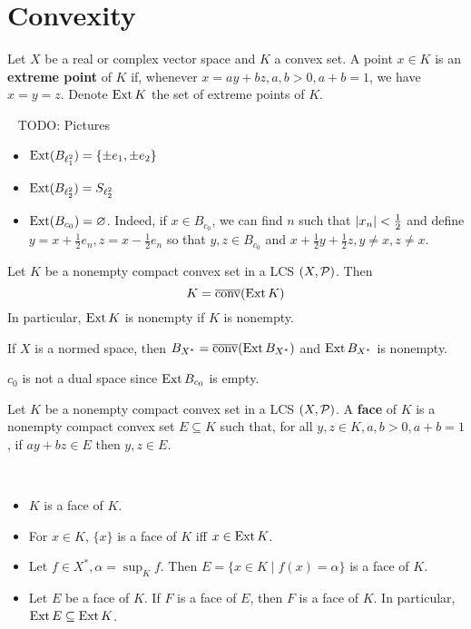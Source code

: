 \documentclass{article}
\begin{document}
\clearpage

\section{Convexity}

Let $X$ be a real or complex vector space and $K$ a convex set. A point $x \in K$ is an {\bf extreme point} of $K$ if, whenever $x = ay + bz, a, b > 0, a + b = 1$, we have $x = y = z$. Denote $\operatorname{Ext} K$ the set of extreme points of $K$.

\begin{egs}~
  TODO: Pictures
  \begin{itemize}
    \item $\operatorname{Ext}(B_{\ell_1^2}) = \{\pm e_1, \pm e_2\}$
    \item $\operatorname{Ext}(B_{\ell_2^2}) = S_{\ell_2^2}$
    \item $\operatorname{Ext}(B_{c_0}) = \varnothing$. Indeed, if $x \in B_{c_0}$, we can find $n$ such that $\left\lvert x_n\right\rvert < \frac 12$ and define $y = x + \frac 12 e_n, z = x - \frac 12 e_n$ so that $y, z \in B_{c_0}$ and $x + \frac 12 y + \frac 12 z, y \ne x, z \ne x$.
  \end{itemize}
\end{egs}

\begin{nthm}\label{thm:krein-milman}
  Let $K$ be a nonempty compact convex set in a LCS $(X, \mathcal P)$. Then
  $$K = \overline{\operatorname{conv}}(\operatorname{Ext} K)$$
  In particular, $\operatorname{Ext} K$ is nonempty if $K$ is nonempty.
\end{nthm}

\begin{ncor}
  If $X$ is a normed space, then $B_{X^*} = \overline{\operatorname{conv}}(\operatorname{Ext} B_{X^*})$ and $\operatorname{Ext} B_{X^*}$ is nonempty.
\end{ncor}

\begin{rmk}
  $c_0$ is not a dual space since $\operatorname{Ext} B_{c_0}$ is empty.
\end{rmk}

\begin{defi}
  Let $K$ be a nonempty compact convex set in a LCS $(X, \mathcal P)$. A {\bf face} of $K$ is a nonempty compact convex set $E \subseteq K$ such that, for all $y, z \in K, a, b > 0, a + b = 1$, if $ay + bz \in E$ then $y, z \in E$.
\end{defi}

\begin{egs}~
  \begin{itemize}
    \item $K$ is a face of $K$.
    \item For $x \in K$, $\{x\}$ is a face of $K$ iff $x \in \operatorname{Ext} K$.
    \item Let $f \in X^*, \alpha = \sup_K f$. Then $E = \{x \in K \mid f(x) = \alpha\}$ is a face of $K$.
    \item Let $E$ be a face of $K$. If $F$ is a face of $E$, then $F$ is a face of $K$. In particular, $\operatorname{Ext} E \subseteq \operatorname{Ext} K$.
  \end{itemize}
\end{egs}
\end{document}
